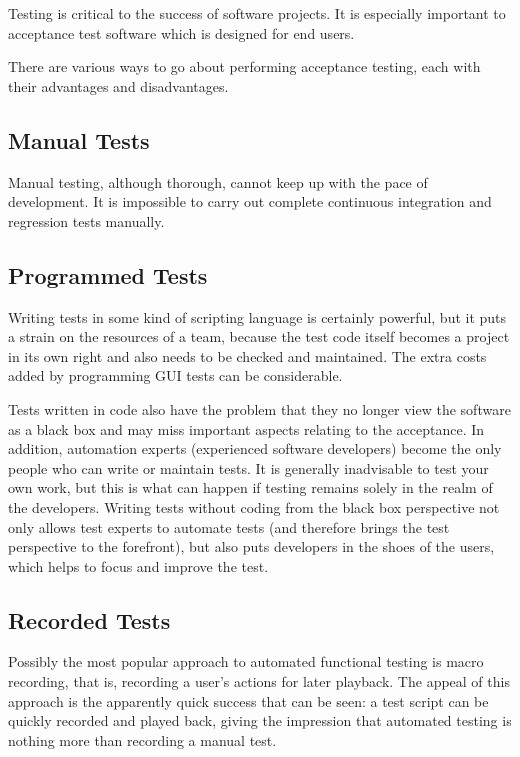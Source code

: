 
Testing is critical to the success of software projects. It is especially important to acceptance test software which is designed for end users.

There are various ways to go about performing acceptance testing, each with their advantages and disadvantages. 

\subsection{Manual Tests}

Manual testing, although thorough, cannot keep up with the pace of development. It is impossible to carry out complete continuous integration and regression tests manually. 


\subsection{Programmed Tests}

Writing tests in some kind of scripting language is certainly powerful, but it puts a strain on the resources of a team, because the test code itself becomes a project in its own right and also needs to be checked and maintained. The extra costs added by programming GUI tests can be considerable. 

Tests written in code also have the problem that they no longer view the software as a black box and may miss important aspects relating to the acceptance. In addition, automation experts (experienced software developers) become the only people who can write or maintain tests. It is generally inadvisable to test your own work, but this is what can happen if testing remains solely in the realm of the developers. Writing tests without coding from the black box perspective not only allows test experts to automate tests (and therefore brings the test perspective to the forefront), but also puts developers in the shoes of the users, which helps to focus and improve the test.  


\subsection{Recorded Tests}
\label{IntroRecording}
Possibly the most popular approach to automated functional testing is macro recording, that is, recording a user's actions for later playback.
The appeal of this approach is the apparently quick success that can be seen: a test script can be quickly recorded and played back, giving the impression that automated testing is nothing more than recording a manual test. 

